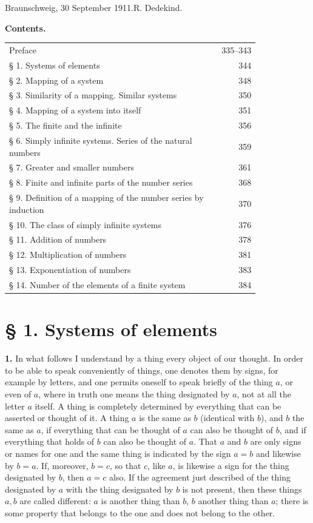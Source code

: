\documentclass[11pt]{article}
\begin{document}
\begin{flushright}Braunschweig, 30 September 1911.\qquad R. Dedekind.\end{flushright}



\begin{center}\textbf{Contents.}\end{center}
\begin{tabular}{@{}p{0.82\linewidth}r@{}}
Preface & 335--343\\
§ 1. Systems of elements & 344\\
§ 2. Mapping of a system & 348\\
§ 3. Similarity of a mapping. Similar systems & 350\\
§ 4. Mapping of a system into itself & 351\\
§ 5. The finite and the infinite & 356\\
§ 6. Simply infinite systems. Series of the natural numbers & 359\\
§ 7. Greater and smaller numbers & 361\\
§ 8. Finite and infinite parts of the number series & 368\\
§ 9. Definition of a mapping of the number series by induction & 370\\
§ 10. The class of simply infinite systems & 376\\
§ 11. Addition of numbers & 378\\
§ 12. Multiplication of numbers & 381\\
§ 13. Exponentiation of numbers & 383\\
§ 14. Number of the elements of a finite system & 384
\end{tabular}

\section*{§ 1. Systems of elements}

\noindent\textbf{1.} In what follows I understand by a thing every object of our thought. In order to be able to speak conveniently of things, one denotes them by signs, for example by letters, and one permits oneself to speak briefly of the thing $a$, or even of $a$, where in truth one means the thing designated by $a$, not at all the letter $a$ itself. A thing is completely determined by everything that can be asserted or thought of it. A thing $a$ is the same as $b$ (identical with $b$), and $b$ the same as $a$, if everything that can be thought of $a$ can also be thought of $b$, and if everything that holds of $b$ can also be thought of $a$. That $a$ and $b$ are only signs or names for one and the same thing is indicated by the sign $a=b$ and likewise by $b=a$. If, moreover, $b=c$, so that $c$, like $a$, is likewise a sign for the thing designated by $b$, then $a=c$ also. If the agreement just described of the thing designated by $a$ with the thing designated by $b$ is not present, then these things $a,b$ are called different: $a$ is another thing than $b$, $b$ another thing than $a$; there is some property that belongs to the one and does not belong to the other.
\end{document}

